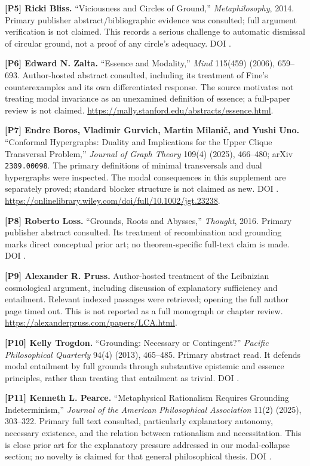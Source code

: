 \documentclass[11pt,a4paper]{article}
\begin{document}
\textbf{{[}P5{]} Ricki Bliss.} ``Viciousness and Circles of Ground,''
\emph{Metaphilosophy}, 2014. Primary publisher abstract/bibliographic
evidence was consulted; full argument verification is not claimed. This
records a serious challenge to automatic dismissal of circular ground,
not a proof of any circle's adequacy. DOI .

\textbf{{[}P6{]} Edward N. Zalta.} ``Essence and Modality,'' \emph{Mind}
115(459) (2006), 659--693. Author-hosted abstract consulted, including
its treatment of Fine's counterexamples and its own differentiated
response. The source motivates not treating modal invariance as an
unexamined definition of essence; a full-paper review is not claimed.
\url{https://mally.stanford.edu/abstracts/essence.html}.

\textbf{{[}P7{]} Endre Boros, Vladimir Gurvich, Martin Milanič, and
Yushi Uno.} ``Conformal Hypergraphs: Duality and Implications for the
Upper Clique Transversal Problem,'' \emph{Journal of Graph Theory}
109(4) (2025), 466--480; arXiv \texttt{2309.00098}. The primary
definitions of minimal transversals and dual hypergraphs were inspected.
The modal consequences in this supplement are separately proved;
standard blocker structure is not claimed as new. DOI
.
\url{https://onlinelibrary.wiley.com/doi/full/10.1002/jgt.23238}.

\textbf{{[}P8{]} Roberto Loss.} ``Grounds, Roots and Abysses,''
\emph{Thought}, 2016. Primary publisher abstract consulted. Its
treatment of recombination and grounding marks direct conceptual prior
art; no theorem-specific full-text claim is made. DOI
.

\textbf{{[}P9{]} Alexander R. Pruss.} Author-hosted treatment of the
Leibnizian cosmological argument, including discussion of explanatory
sufficiency and entailment. Relevant indexed passages were retrieved;
opening the full author page timed out. This is not reported as a full
monograph or chapter review.
\url{https://alexanderpruss.com/papers/LCA.html}.

\textbf{{[}P10{]} Kelly Trogdon.} ``Grounding: Necessary or
Contingent?'' \emph{Pacific Philosophical Quarterly} 94(4) (2013),
465--485. Primary abstract read. It defends modal entailment by full
grounds through substantive epistemic and essence principles, rather
than treating that entailment as trivial. DOI .

\textbf{{[}P11{]} Kenneth L. Pearce.} ``Metaphysical Rationalism
Requires Grounding Indeterminism,'' \emph{Journal of the American
Philosophical Association} 11(2) (2025), 303--322. Primary full text
consulted, particularly explanatory autonomy, necessary existence, and
the relation between rationalism and necessitation. This is close prior
art for the explanatory pressure addressed in our modal-collapse
section; no novelty is claimed for that general philosophical thesis.
DOI .
\end{document}
